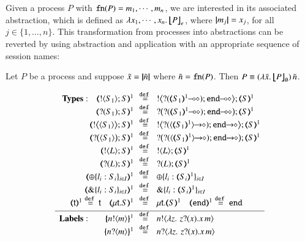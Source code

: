 Given a process $P$ with $\mathtt{fn}(P) = m_1, \cdots, m_n$, we are interested in its associated abstraction, which is defined as
$\lambda x_1, \cdots, x_n.\,\big\lfloor\!\!\big\lfloor P\big\rfloor\!\!\big\rfloor^{}_\epsilon$, where $|\!|m_j|\!| = x_j$, for all $j \in \{1, \ldots, n\}$.
This transformation from processes into abstractions can be reverted by
using abstraction and application with an appropriate sequence of session names:
%
\begin{proposition}\rm
	Let $P$ be a \HOp process and 
	suppose $\tilde{x} = |\!|\tilde{n}|\!|$ where 
$\tilde{n} = \mathtt{fn}(P)$.
	Then $P \equiv (\lambda \tilde{x}.\,\big\lfloor\!\!\big\lfloor P\big\rfloor\!\!\big\rfloor^{}_\emptyset)\, {\tilde{n}}$.
\end{proposition}

\begin{figure}[t]
\[
\begin{array}{rcll}
\noindent{\bf Types:} \quad 
		\tmap{\btout{S_1} {S} }{1}	&\!\!\defeq\!\!&	\bbtout{\lhot{\btinp{\lhot{\tmap{S_1}{1}}}\tinact}} \tmap{S}{1}  \\
		\tmap{\btinp{S_1} S }{1}	&\!\!\defeq\!\!&	\bbtinp{\lhot{\btinp{\lhot{\tmap{S_1}{1}}}\tinact}} \tmap{S}{1} \\
		\tmap{\bbtout{\chtype{S_1}} {S} }{1}	&\!\!\defeq\!\!&	\bbtout{\shot{\btinp{\shot{\chtype{\tmap{S_1}{1}}}}\tinact}} \tmap{S}{1}  \\
		\tmap{\bbtinp{\chtype{S_1}} {S} }{1}	&\!\!\defeq\!\!&	\bbtinp{\shot{\btinp{\shot{\chtype{\tmap{S_1}{1}}}}\tinact}} \tmap{S}{1} \\
		\tmap{\btout{L} S}{1} &\!\!\defeq\!\!& \btout{L} \tmap{S}{1}\\
		\tmap{\btinp{L} S}{1} &\!\!\defeq\!\!& \btinp{L} \tmap{S}{1}\\
		\tmap{\btsel{l_i: S_i}_{i \in I}}{1} &\!\!\defeq\!\!& \btsel{l_i: \tmap{S_i}{1}}_{i \in I}\\
		\tmap{\btbra{l_i: S_i}_{i \in I}}{1} &\!\!\defeq\!\!& \btbra{l_i: \tmap{S_i}{1}}_{i \in I}\\
\tmap{\vart{t}}{1} \defeq \vart{t} \quad 
		\tmap{\trec{t}{S}}{1}  &\!\!\defeq\!\!&
\trec{t}{\tmap{S}{1}}\quad 
\tmap{\tinact}{1}  \defeq  \tinact\\[1mm]
\hline
\noindent{\bf Labels:} \quad \quad 
	\mapa{\bactout{n}{m}}^{1} &\!\!\defeq\!\!&   \bactout{n}{\abs{z}{\,\binp{z}{x} \appl{x}{m}} } \\
	\mapa{\bactinp{n}{m}}^{1} &\!\!\defeq\!\!&   \bactinp{n}{\abs{z}{\,\binp{z}{x} \appl{x}{m}} } \\

\end{array}\]
\end{figure}
